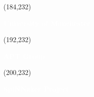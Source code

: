   

      
  \begin{textblock}{20}(184,232)
    \begin{rotate}{90}
      {\Large\bfseries \textcolor{white}{University of Manchester}}
    \end{rotate}
  \end{textblock}
  
  \begin{textblock}{20}(192,232)
    \begin{rotate}{90}
      {\Large\bfseries \textcolor{white}{APT Group}}
    \end{rotate}
  \end{textblock}
    
  \begin{textblock}{20}(200,232)
    \begin{rotate}{90}
      {\Large\bfseries \textcolor{white}{SpiNNaker Project}}
    \end{rotate}
  \end{textblock} 
%    
  

